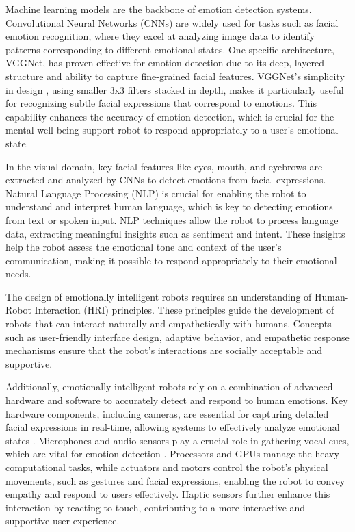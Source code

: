 Machine learning models are the backbone of emotion detection systems. Convolutional Neural Networks (CNNs) \cite{computation11030052} are widely used for tasks such as facial emotion recognition, where they excel at analyzing image data to identify patterns corresponding to different emotional states. One specific architecture, VGGNet, has proven effective for emotion detection due to its deep, layered structure and ability to capture fine-grained facial features. VGGNet's simplicity in design \cite{computation11030052}, using smaller 3x3 filters stacked in depth, makes it particularly useful for recognizing subtle facial expressions that correspond to emotions. This capability enhances the accuracy of emotion detection, which is crucial for the mental well-being support robot to respond appropriately to a user's emotional state.

In the visual domain, key facial features like eyes, mouth, and eyebrows are extracted and analyzed by CNNs to detect emotions from facial expressions. Natural Language Processing (NLP) is crucial for enabling the robot to understand and interpret human language, which is key to detecting emotions from text or spoken input. NLP techniques allow the robot to process language data, extracting meaningful insights such as sentiment and intent. These insights help the robot assess the emotional tone and context of the user’s communication, making it possible to respond appropriately to their emotional needs.

The design of emotionally intelligent robots requires an understanding of Human-Robot Interaction (HRI) principles. These principles guide the development of robots that can interact naturally and empathetically with humans. Concepts such as user-friendly interface design, adaptive behavior, and empathetic response mechanisms ensure that the robot’s interactions are socially acceptable and supportive.

Additionally, emotionally intelligent robots rely on a combination of advanced hardware and software to accurately detect and respond to human emotions. Key hardware components, including cameras, are essential for capturing detailed facial expressions in real-time, allowing systems to effectively analyze emotional states \cite{gupta-2024}. Microphones and audio sensors play a crucial role in gathering vocal cues, which are vital for emotion detection \cite{10.48175/ijarsct-15385}. Processors and GPUs manage the heavy computational tasks, while actuators and motors control the robot’s physical movements, such as gestures and facial expressions, enabling the robot to convey empathy and respond to users effectively. Haptic sensors further enhance this interaction by reacting to touch, contributing to a more interactive and supportive user experience.

